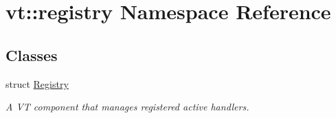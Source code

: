 \hypertarget{namespacevt_1_1registry}{}\section{vt\+:\+:registry Namespace Reference}
\label{namespacevt_1_1registry}
\subsection*{Classes}
\begin{DoxyCompactItemize}
\item 
struct \hyperlink{structvt_1_1registry_1_1_registry}{Registry}
\begin{DoxyCompactList}\small\item\em A VT component that manages registered active handlers. \end{DoxyCompactList}\end{DoxyCompactItemize}
